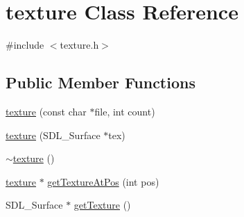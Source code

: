 \hypertarget{classtexture}{\section{texture Class Reference}
\label{classtexture}
}


{\ttfamily \#include $<$texture.\-h$>$}

\subsection*{Public Member Functions}
\begin{DoxyCompactItemize}
\item 
\hyperlink{classtexture_a8dd00d9a5b53b82421efd40d1471f877}{texture} (const char $\ast$file, int count)
\item 
\hyperlink{classtexture_a612f21e2f69df18b54a56ade8e4eec59}{texture} (S\-D\-L\-\_\-\-Surface $\ast$tex)
\item 
\hyperlink{classtexture_a5b4f688537fcc04427d7aaf2a35996bd}{$\sim$texture} ()
\item 
\hyperlink{classtexture}{texture} $\ast$ \hyperlink{classtexture_ab5a6671d4f348d5e62eedd2c4519c5dd}{get\-Texture\-At\-Pos} (int pos)
\item 
S\-D\-L\-\_\-\-Surface $\ast$ \hyperlink{classtexture_ac5ee5635e548e3939f79fd6e596221d3}{get\-Texture} ()
\end{DoxyCompactItemize}


